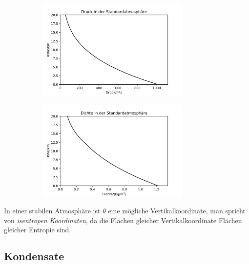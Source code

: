 \documentclass{book}
\begin{document}
\begin{figure}
\centering
\begin{subfigure}[c]{.49\textwidth}
\centering
\includegraphics[height = 5cm]{figs/standard_atmosphere_pressure.png}
\end{subfigure}
\begin{subfigure}[c]{.49\textwidth}
\centering
\includegraphics[height = 5cm]{figs/standard_atmosphere_density.png}
\end{subfigure}
\end{figure}

In einer stabilen Atmosphäre ist $\theta$ eine mögliche Vertikalkoordinate, man spricht von \textit{isentropen Koordinaten}, da die Flächen gleicher Vertikalkoordinate Flächen gleicher Entropie sind.

\subsection{Kondensate}
\label{sec:kondensate}
\end{document}
